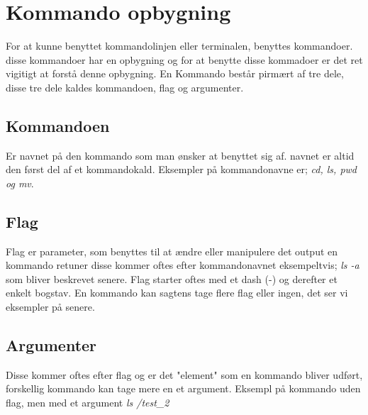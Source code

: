 \section{Kommando opbygning}
For at kunne benyttet kommandolinjen eller terminalen, benyttes kommandoer. disse kommandoer har en opbygning og for at benytte disse kommadoer er det ret vigitigt at forstå denne opbygning. En Kommando består pirmært af tre dele, disse tre dele kaldes kommandoen, flag og argumenter.  
\subsection*{Kommandoen}
Er navnet på den kommando som man ønsker at benyttet sig af. navnet er altid den først del af et kommandokald. Eksempler på 
kommandonavne er; \textit{cd, ls, pwd og mv}.
\subsection*{Flag}
Flag er parameter, som benyttes til at ændre eller manipulere det output en kommando retuner disse kommer oftes efter kommandonavnet eksempeltvis; \textit{ls -a} som bliver beskrevet senere. Flag starter oftes med et dash (-) og derefter et enkelt bogstav. En kommando kan sagtens tage flere flag eller ingen, det ser vi eksempler på senere.
\subsection*{Argumenter}
Disse kommer oftes efter flag og er det "element" som en kommando bliver udført, forskellig kommando kan tage mere en et argument. Eksempl på kommando uden flag, men med et argument \textit{ls /test\_2}
